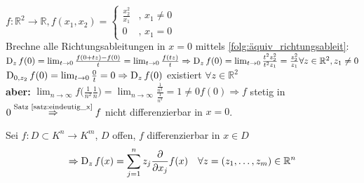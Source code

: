     \begin{beispiel}
        $f: \mathbb{R}^2 \to \mathbb{R}, f(x_1,x_2) = 
        \begin{cases}
            \frac{x_2^2}{x_1} & \text{, } x_1 \neq 0 \\
            0 & \text{, } x_1 = 0
        \end{cases}$\\
        Brechne alle Richtungsableitungen in $x=0$ mittels \ref{folg:äquiv_richtungsableit}:\\
        $\operatorname{D}_zf(0) = \lim_{t \to 0} \frac{f(0 + tz) - f(0)}{t} = \lim_{t \to 0}\frac{f(tz)}{t} \Rightarrow \operatorname{D}_z f(0) = \lim_{t\to 0} \frac{t^2 z_2^2}{t^2 z_1} = \frac{z_2^2}{z_1} \forall z \in \mathbb{R}^2, z_1 \neq 0$\\
        $\operatorname{D}_{0,z_2}f(0) = \lim_{t\to 0} \frac{0}{t} = 0 \Rightarrow \operatorname{D}_z f(0)$ existiert $\forall z \in \mathbb{R}^2$\\
        \textbf{aber:} $\lim_{n\to \infty} f\Big(\frac{1}{n^2}\frac{1}{n}\Big) = \lim_{n\to \infty} \frac{\frac{1}{n^2}}{\frac{1}{n^2}}=1 \neq 0 f(0) \Rightarrow f$ stetig in $0 \overset{\text{Satz \ref{satz:eindeutig_x}}}{\Rightarrow} f$ nicht differenzierbar in $x = 0$.
    \end{beispiel}
    \begin{folgerung}
        Sei $f: D\subset K^n \to K^m$, $D$ offen, $f$ differenzierbar in $x \in D$
            \begin{align}
                \Rightarrow \operatorname{D}_z f(x) = \sum_{j=1}^{n}z_j\frac{\partial}{\partial x_j}f(x) \quad \forall z = (z_1,\dots, z_m) \in \mathbb{R}^n
            \end{align}
    \end{folgerung}
